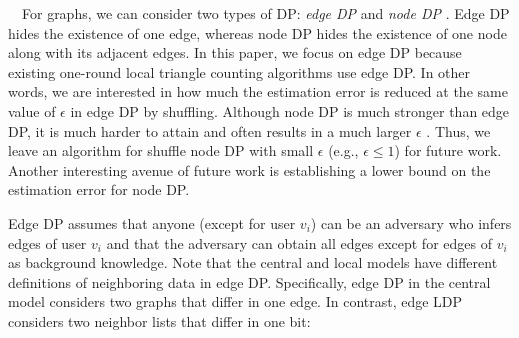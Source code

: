 
\smallskip
{}~~For graphs, we can consider two types of DP: 
\textit{edge DP} and \textit{node DP} \cite{Hay_ICDM09,Raskhodnikova_Encyclopedia16}. 
Edge DP hides the existence of one edge, whereas node DP hides the existence of one node along with its adjacent edges. 
In this paper, we focus on edge DP because existing one-round local triangle counting algorithms \cite{Imola_USENIX21,Imola_USENIX22,Ye_ICDE20,Ye_TKDE21} use edge DP. 
In other words, we are interested in 
how much the estimation error is reduced at the same value of $\epsilon$ in edge DP by shuffling. 
Although node DP is much stronger than edge DP, it is much harder to attain and often results in a much larger $\epsilon$ \cite{Chen_SIGMOD13,Sajadmanesh_arXiv22}. 
Thus, we leave an algorithm for shuffle node DP with small $\epsilon$ (e.g., $\epsilon \leq 1$) for future work. 
Another interesting avenue of future work is establishing a lower bound on the estimation error for node DP. 

Edge DP assumes that anyone (except for user $v_i$) can be an adversary who infers edges of user $v_i$ and that the adversary can obtain all edges except for edges of $v_i$ as background knowledge. 
Note that the central and local models have different definitions of neighboring data in edge DP. 
Specifically, edge DP in the central model \cite{Raskhodnikova_Encyclopedia16} considers two graphs that differ in one edge. 
In contrast, edge LDP 
\cite{Qin_CCS17} considers two neighbor lists that differ in one bit: 

